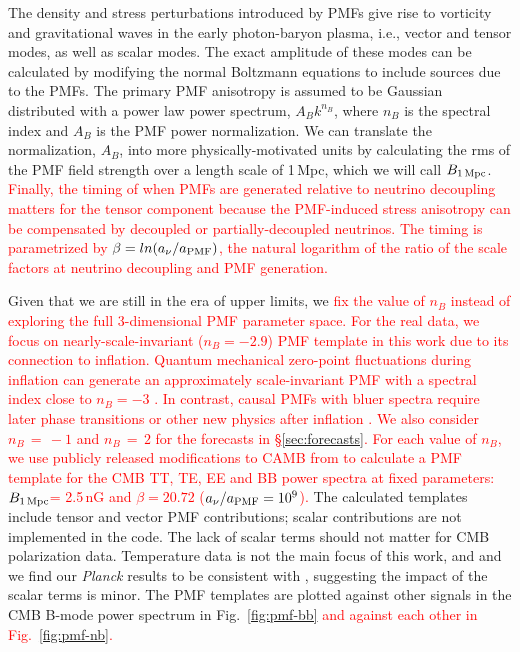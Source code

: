 \documentclass[apj]{emulateapj}
\newcommand{\bpmf}{\ensuremath{B_{\rm 1\,Mpc}}}
\newcommand{\planck}{{\sl Planck}}
\newcommand{\changed}[1]{\textcolor{Red}{#1}}
\begin{document}
The density and stress perturbations introduced by PMFs give rise to vorticity and gravitational waves in the early photon-baryon  plasma, i.e., vector and tensor modes, as well as scalar modes. 
The exact amplitude of these modes can be calculated by modifying the normal Boltzmann equations to include sources due to the PMFs. 
The primary PMF anisotropy is assumed to be Gaussian distributed with a power law power spectrum, $A_B k^{n_B}$, where $n_B$ is the spectral index and $A_B$ is the PMF power normalization. 
We can translate the normalization, $A_B$, into more physically-motivated units by calculating the rms of the PMF field strength over a length scale of 1\,Mpc, which we will call \bpmf. 
\changed{
Finally, the timing of when PMFs are generated relative to neutrino decoupling matters for the tensor component because the PMF-induced stress anisotropy can be compensated by decoupled or partially-decoupled neutrinos. 
The timing is  parametrized by $\beta = ln(a_{\nu}/a_{\rm{PMF}})$,  the natural logarithm of the ratio of the scale factors at neutrino decoupling and PMF generation. 
}

Given that we are still in the era of upper limits, we \changed{fix the value of $n_B$ instead of exploring the full 3-dimensional PMF parameter space. 
For the real data, we focus on nearly-scale-invariant ($n_B = -2.9$) PMF template in this work due to its connection to inflation.  
Quantum mechanical zero-point fluctuations during inflation can generate an approximately scale-invariant PMF with a spectral index close to $n_B = -3$ \citep[e.g.,][]{turner88, mack01,2008PhRvD..78f3012K}. %
In contrast, causal PMFs with bluer spectra require later phase transitions or other new physics after inflation \citep[e.g.,][]{durrer03, subramanian16}. 
We also consider $n_B\,=\,-1$ and $n_B\,=\,2$ for the forecasts in \S\ref{sec:forecasts}. 
For each value of $n_B$, we use publicly released modifications to CAMB from \citet{zucca16} to calculate a PMF template for the CMB TT, TE, EE and BB power spectra at fixed parameters: \bpmf = 2.5\,nG and $\beta=20.72$ ($a_{\nu}/a_{\rm{PMF}} = 10^9$).} 
The calculated templates include tensor and vector PMF contributions; scalar contributions are not implemented in the code. 
The lack of scalar terms should not matter for CMB polarization data. 
Temperature data is not the main focus of this work, and  and we find our \planck{} results  to be consistent with \citet{planck15-19}, suggesting the impact of the scalar terms is minor. 
The PMF templates are plotted against other signals in the CMB B-mode power spectrum in Fig.~\ref{fig:pmf-bb} \changed{and against each other in Fig.~\ref{fig:pmf-nb}. }
\end{document}
